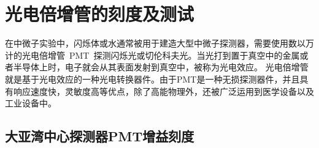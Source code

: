 
\chapter{光电倍增管的刻度及测试}
\label{chap:chap3}
在中微子实验中，闪烁体或水通常被用于建造大型中微子探测器，需要使用数以万计的光电倍增管~PMT~探测闪烁光或切伦科夫光。当光打到置于真空中的金属或者半导体上时，电子就会从其表面发射到真空中，被称为光电效应。%
光电倍增管就是基于光电效应的一种光电转换器件。由于PMT是一种无损探测器件，并且具有响应速度快，灵敏度高等优点，除了高能物理外，还被广泛运用到医学设备以及工业设备中。


\section{大亚湾中心探测器PMT增益刻度}
